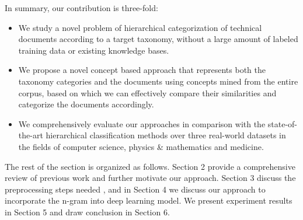 In summary, our contribution is three-fold:
\begin{itemize}[leftmargin=*]
    \item We study a novel problem of hierarchical categorization of technical documents according to a target taxonomy, without a large amount of labeled training data or existing knowledge bases.
    \item 
    We propose a novel concept based approach that represents both the taxonomy categories and the documents using concepts mined from the entire corpus, based on which we can effectively compare their similarities and categorize the documents accordingly.
    \item We comprehensively evaluate our approaches in comparison with the state-of-the-art hierarchical classification methods over three real-world datasets in the fields of computer science, physics \& mathematics and medicine.
\end{itemize}

The rest of the section is organized as follows. Section 2 provide a comprehensive review of previous work and further motivate our approach. Section 3 discuss the preprocessing steps needed , and in Section 4 we discuss our approach to incorporate the n-gram into deep learning model. We present experiment results in Section 5 and draw conclusion in Section 6.
